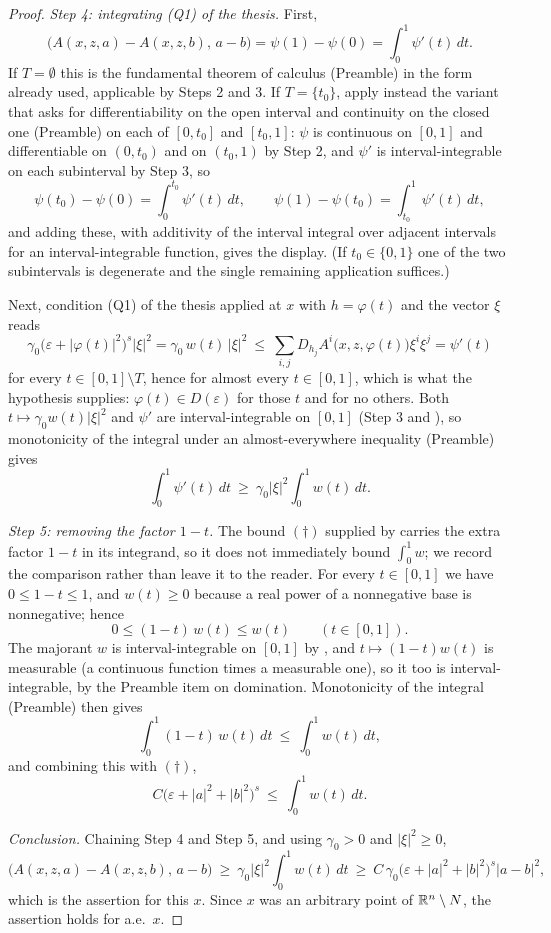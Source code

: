 \begin{proof}
\emph{Step 4: integrating (Q1) of the thesis.}  First,
\[
\bigl(A(x,z,a)-A(x,z,b),\,a-b\bigr)=\psi(1)-\psi(0)=\int_0^1\psi'(t)\,dt .
\]
If $T=\emptyset$ this is the fundamental theorem of calculus (Preamble) in the
form already used, applicable by Steps 2 and 3.  If $T=\{t_0\}$, apply instead
the variant that asks for differentiability on the open interval and continuity
on the closed one (Preamble) on each of $[0,t_0]$ and $[t_0,1]$: $\psi$ is
continuous on $[0,1]$ and differentiable on $(0,t_0)$ and on $(t_0,1)$ by
Step 2, and $\psi'$ is interval-integrable on each subinterval by Step 3, so
\[
\psi(t_0)-\psi(0)=\int_0^{t_0}\psi'(t)\,dt,
\qquad
\psi(1)-\psi(t_0)=\int_{t_0}^1\psi'(t)\,dt ,
\]
and adding these, with additivity of the interval integral over adjacent
intervals for an interval-integrable function, gives the display.  (If
$t_0\in\{0,1\}$ one of the two subintervals is degenerate and the single
remaining application suffices.)

Next, condition (Q1) of the thesis applied at $x$ with $h=\varphi(t)$ and the vector
$\xi$ reads
\[
\gamma_0\bigl(\varepsilon+|\varphi(t)|^2\bigr)^{s}|\xi|^2
=\gamma_0\,w(t)\,|\xi|^2\ \le\
\sum_{i,j}D_{h_j}A^i\bigl(x,z,\varphi(t)\bigr)\xi^i\xi^j=\psi'(t)
\]
for every $t\in[0,1]\setminus T$, hence for almost every $t\in[0,1]$, which is
what the hypothesis supplies: $\varphi(t)\in D(\varepsilon)$ for those $t$ and
for no others.  Both $t\mapsto\gamma_0w(t)|\xi|^2$ and $\psi'$ are
interval-integrable on $[0,1]$ (Step 3 and
), so monotonicity of the integral under an
almost-everywhere inequality (Preamble) gives
\[
\int_0^1\psi'(t)\,dt\ \ge\ \gamma_0|\xi|^2\int_0^1w(t)\,dt .
\tag{$**$}
\]

\emph{Step 5: removing the factor $1-t$.}  The bound $(\dagger)$ supplied by
\noderef{MidpointGradientWeightBound} carries the extra factor $1-t$ in its
integrand, so it does not immediately bound $\int_0^1w$; we record the
comparison rather than leave it to the reader.  For every $t\in[0,1]$ we have
$0\le1-t\le1$, and $w(t)\ge0$ because a real power of a nonnegative base is
nonnegative; hence
\[
0\le(1-t)\,w(t)\le w(t)\qquad(t\in[0,1]).
\]
The majorant $w$ is interval-integrable on $[0,1]$ by
, and $t\mapsto(1-t)w(t)$ is measurable
(a continuous function times a measurable one), so it too is
interval-integrable, by the Preamble item on domination.  Monotonicity of the
integral (Preamble) then gives
\[
\int_0^1(1-t)\,w(t)\,dt\ \le\ \int_0^1w(t)\,dt ,
\]
and combining this with $(\dagger)$,
\[
C\bigl(\varepsilon+|a|^2+|b|^2\bigr)^{s}\ \le\ \int_0^1w(t)\,dt .
\]

\emph{Conclusion.}  Chaining Step 4 and Step 5, and using $\gamma_0>0$ and
$|\xi|^2\ge0$,
\[
\bigl(A(x,z,a)-A(x,z,b),\,a-b\bigr)\ \ge\ \gamma_0|\xi|^2\int_0^1w(t)\,dt
\ \ge\ C\,\gamma_0\bigl(\varepsilon+|a|^2+|b|^2\bigr)^{s}|a-b|^2 ,
\]
which is the assertion for this $x$.  Since $x$ was an arbitrary point of
$\mathbb{R}^n\setminus N$, the assertion holds for a.e.\ $x$.
\end{proof}

